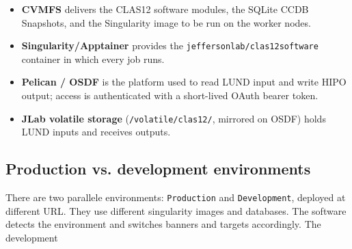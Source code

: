 \begin{itemize}
  \item \textbf{CVMFS} delivers the CLAS12 software modules, the SQLite CCDB Snapshots,
  and the Singularity image to be run on the worker nodes.
  \item \textbf{Singularity/Apptainer} provides the \texttt{jeffersonlab/\allowbreak{}clas12software} container
  in which every job runs.
  \item \textbf{Pelican / OSDF} is the platform used to read LUND input and write HIPO output; access is
  authenticated with a short-lived OAuth bearer token.
  \item \textbf{JLab volatile storage} (\texttt{/\allowbreak{}volatile/\allowbreak{}clas12/\allowbreak{}},
  mirrored on OSDF) holds LUND inputs and receives outputs.
\end{itemize}

\subsection{Production vs. development environments}

There are two parallele environments: \texttt{Production} and \texttt{Development}, deployed at different URL.
They use different singularity images and databases. The software detects the environment
and switches banners and targets accordingly. The development

